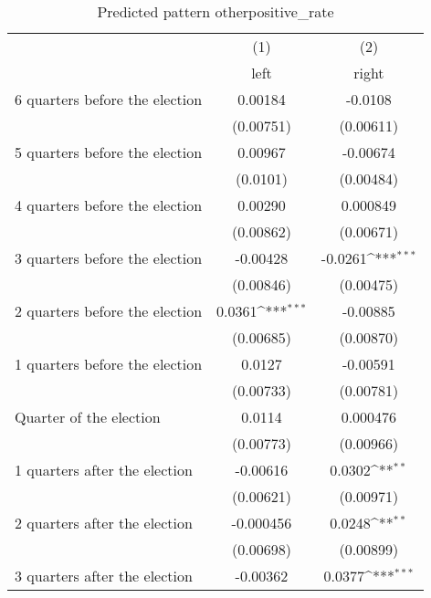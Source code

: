 \begin{table}[htbp]\centering
\def\sym#1{\ifmmode^{#1}\else\(^{#1}\)\fi}
\caption{Predicted pattern otherpositive\_rate}
\begin{tabular}{l*{2}{c}}
\hline\hline
                    &\multicolumn{1}{c}{(1)}&\multicolumn{1}{c}{(2)}\\
                    &\multicolumn{1}{c}{left}&\multicolumn{1}{c}{right}\\
\hline
 6 quarters before the election&     0.00184         &     -0.0108         \\
                    &   (0.00751)         &   (0.00611)         \\
[1em]
 5 quarters before the election&     0.00967         &    -0.00674         \\
                    &    (0.0101)         &   (0.00484)         \\
[1em]
 4 quarters before the election&     0.00290         &    0.000849         \\
                    &   (0.00862)         &   (0.00671)         \\
[1em]
 3 quarters before the election&    -0.00428         &     -0.0261\sym{***}\\
                    &   (0.00846)         &   (0.00475)         \\
[1em]
 2 quarters before the election&      0.0361\sym{***}&    -0.00885         \\
                    &   (0.00685)         &   (0.00870)         \\
[1em]
 1 quarters before the election&      0.0127         &    -0.00591         \\
                    &   (0.00733)         &   (0.00781)         \\
[1em]
Quarter of the election&      0.0114         &    0.000476         \\
                    &   (0.00773)         &   (0.00966)         \\
[1em]
 1 quarters after the election&    -0.00616         &      0.0302\sym{**} \\
                    &   (0.00621)         &   (0.00971)         \\
[1em]
 2 quarters after the election&   -0.000456         &      0.0248\sym{**} \\
                    &   (0.00698)         &   (0.00899)         \\
[1em]
 3 quarters after the election&    -0.00362         &      0.0377\sym{***}\\

\end{tabular}
\end{table}
